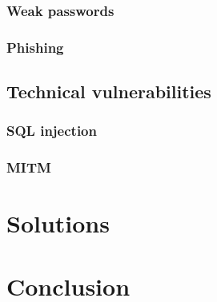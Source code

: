 \documentclass[11pt]{article}
\begin{document}
\subsubsection{Weak passwords}
\subsubsection{Phishing}
\subsection{Technical vulnerabilities}
\subsubsection{SQL injection}
\subsubsection{MITM}


\section{Solutions} \label{SOL}


\section{Conclusion} \label{CONCL}




\end{document}
